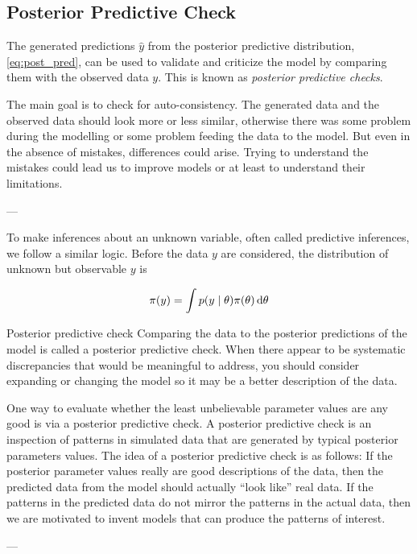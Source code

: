 \subsection{Posterior Predictive Check}

The generated predictions $\hat{y}$ from the posterior predictive distribution, \autoref{eq:post_pred}, can be used to validate and criticize the model by comparing them with the observed data $y$. This is known as \textit{posterior predictive checks}. 

The main goal is to check for auto-consistency. The generated data and the observed data should look more or less similar, otherwise there was some problem during the modelling or some problem feeding the data to the model. But even in the absence of mistakes, differences could arise. Trying to understand the mistakes could lead us to improve models or at least to understand their limitations.  

---

To make inferences about an unknown variable, often called predictive inferences, we follow a similar logic. Before the data $y$ are considered, the distribution of unknown but observable $y$ is 

\begin{equation}\label{eq:prior_predictive}
    \pi (y) = \int p \qty(y \mid \theta) \pi \qty(\theta) \dd{\theta}
\end{equation}


Posterior predictive check
Comparing the data to the posterior predictions of the model is called a posterior predictive check. When there appear to be systematic discrepancies that would be meaningful to address, you should consider expanding or changing the model so it may be a better description of the data.

One way to evaluate whether the least unbelievable parameter values are any good is via a posterior predictive check. A posterior predictive check is an inspection of patterns in simulated data that are generated by typical posterior parameters values. The idea of a posterior predictive check is as follows: If the posterior parameter values really are good descriptions of the data, then the predicted data from the model should actually “look like” real data. If the patterns in the predicted data do not mirror the patterns in the actual data, then we are motivated to invent models that can produce the patterns of interest.

---

